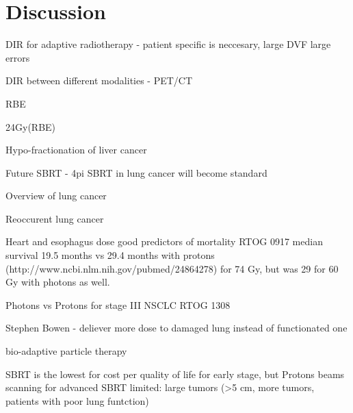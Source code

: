 \documentclass[type=dr, dr=rernat, accentcolor=tud7b,colorbacktitle, bigchapter, openright, twoside, 12pt ]{tudthesis}
\begin{document}
\chapter{Discussion}



DIR for adaptive radiotherapy - patient specific is neccesary, large DVF large errors %

DIR between different modalities - PET/CT %

RBE

24Gy(RBE) %

Hypo-fractionation of liver cancer %

Future SBRT - 4pi %
SBRT in lung cancer will become standard 

Overview of lung cancer %

Reoccurent lung cancer %

Heart and esophagus dose good predictors of mortality RTOG 0917 median survival 19.5 months vs 29.4 months with protons (http://www.ncbi.nlm.nih.gov/pubmed/24864278) for 74 Gy, but was 29 for 60 Gy with photons as well.

Photons vs Protons for stage III NSCLC RTOG 1308

Stephen Bowen - deliever more dose to damaged lung instead of functionated one

bio-adaptive particle therapy

SBRT is the lowest for cost per quality of life for early stage, but Protons beams scanning for advanced %
SBRT limited: large tumors (>5 cm, more tumors, patients with poor lung funtction)


{}
% 
\end{document}
